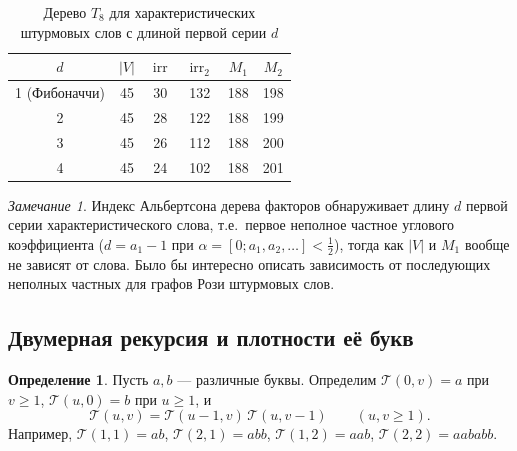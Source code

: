 \documentclass[a4paper,14pt]{extreport}
\theoremstyle{plain}
\theoremstyle{definition}
\newtheorem{definition}{Определение}[section]
\theoremstyle{remark}
\newtheorem{remark}{Замечание}
\begin{document}
\begin{table}[H]
	\centering
	\caption{Дерево $T_8$ для характеристических штурмовых слов с длиной первой серии $d$}
	\begin{tabular}{|c|c|c|c|c|c|}
		\hline
		$d$ & $|V|$ & $\operatorname{irr}$ & $\operatorname{irr}_2$ & $M_1$ & $M_2$ \\ \hline
		1 (Фибоначчи) & 45 & 30 & 132 & 188 & 198 \\ \hline
		2 & 45 & 28 & 122 & 188 & 199 \\ \hline
		3 & 45 & 26 & 112 & 188 & 200 \\ \hline
		4 & 45 & 24 & 102 & 188 & 201 \\ \hline
	\end{tabular}
\end{table}

\begin{remark}
	Индекс Альбертсона дерева факторов обнаруживает длину $d$ первой серии характеристического слова, т.е.\ первое неполное частное углового коэффициента ($d=a_1-1$ при $\alpha=[0;a_1,a_2,\dots]<\tfrac12$),
	тогда как $|V|$ и $M_1$ вообще не зависят от слова. Было бы интересно описать зависимость от последующих неполных частных для графов Рози штурмовых слов.
\end{remark}

\subsection{Двумерная рекурсия и плотности её букв}\label{sec04}

\begin{definition}\label{newfibword}
	Пусть $a,b$ --- различные буквы. Определим $\mathscr T(0,v)=a$ при $v\ge1$, $\mathscr T(u,0)=b$ при $u\ge1$, и
	\begin{equation}
		\mathscr T(u,v)=\mathscr T(u-1,v)\,\mathscr T(u,v-1)\qquad(u,v\ge1).
	\end{equation}
	Например, $\mathscr T(1,1)=ab$, $\mathscr T(2,1)=abb$, $\mathscr T(1,2)=aab$, $\mathscr T(2,2)=aababb$.
\end{definition}
\end{document}
